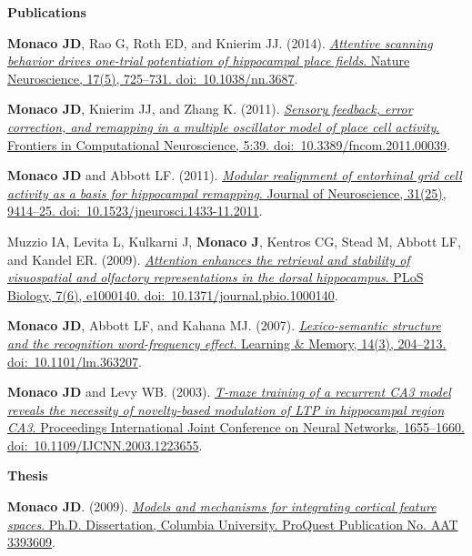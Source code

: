 \documentclass[10pt]{article}
\begin{document}
{\large \textbf{Publications}}

\begin{description}
\item \textbf{Monaco JD}, Rao G, Roth ED, and Knierim JJ. (2014). \href{http://dx.doi.org/10.1038/nn.3687}{\emph{Attentive scanning behavior drives one-trial potentiation of hippocampal place fields}. Nature Neuroscience, 17(5), 725--731. doi:~10.1038/nn.3687}.
\item \textbf{Monaco JD}, Knierim JJ, and Zhang K. (2011). \href{http://dx.doi.org/10.3389/fncom.2011.00039}{\emph{Sensory feedback, error correction, and remapping in a multiple oscillator model of place cell activity}. Frontiers in Computational Neuroscience, 5:39. doi:~10.3389/fncom.2011.00039}.
\item \textbf{Monaco JD} and Abbott LF. (2011). \href{http://dx.doi.org/10.1523/JNEUROSCI.1433-11.2011}{\emph{Modular realignment of entorhinal grid cell activity as a basis for hippocampal remapping}. Journal of Neuroscience, 31(25), 9414--25. doi:~10.1523/jneurosci.1433-11.2011}.
\item Muzzio IA, Levita L, Kulkarni J, \textbf{Monaco J}, Kentros CG, Stead M, Abbott LF, and Kandel ER. (2009). \href{http://dx.doi.org/10.1371/journal.pbio.1000140}{\emph{Attention enhances the retrieval and stability of visuospatial and olfactory representations in the dorsal hippocampus}. PLoS Biology, 7(6), e1000140. doi:~10.1371/journal.pbio.1000140}.
\item \textbf{Monaco JD}, Abbott LF, and Kahana MJ. (2007). \href{http://dx.doi.org/10.1101/lm.363207}{\emph{Lexico-semantic structure and the recognition word-frequency effect}. Learning \& Memory, 14(3), 204--213. doi:~10.1101/lm.363207}.
\item \textbf{Monaco JD} and Levy WB. (2003). \href{http://dx.doi.org/10.1109/IJCNN.2003.1223655}{\emph{T-maze training of a recurrent CA3 model reveals the necessity of novelty-based modulation of LTP in hippocampal region CA3}. Proceedings International Joint Conference on Neural Networks, 1655--1660. doi:~10.1109/IJCNN.2003.1223655}.
\end{description}

{\large \textbf{Thesis}}

\begin{description}
\item \textbf{Monaco JD}. (2009). \href{http://search.proquest.com/docview/304862872/abstract}{\emph{Models and mechanisms for integrating cortical feature spaces}. Ph.D. Dissertation, Columbia University. ProQuest Publication No. AAT 3393609}.
\end{description}
\end{document}
